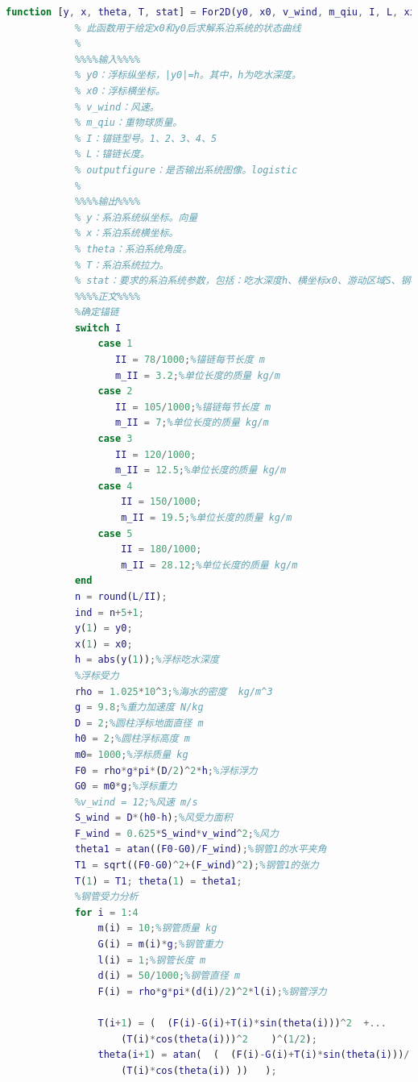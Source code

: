             \begin{lstlisting}[language = Matlab]
            function [y, x, theta, T, stat] = For2D(y0, x0, v_wind, m_qiu, I, L, xitong_figure)
            % 此函数用于给定x0和y0后求解系泊系统的状态曲线
            %
            %%%%输入%%%%
            % y0：浮标纵坐标，|y0|=h。其中，h为吃水深度。
            % x0：浮标横坐标。
            % v_wind：风速。
            % m_qiu：重物球质量。
            % I：锚链型号。1、2、3、4、5
            % L：锚链长度。
            % outputfigure：是否输出系统图像。logistic
            %
            %%%%输出%%%%
            % y：系泊系统纵坐标。向量
            % x：系泊系统横坐标。
            % theta：系泊系统角度。
            % T：系泊系统拉力。
            % stat：要求的系泊系统参数，包括：吃水深度h、横坐标x0、游动区域S、钢桶竖直夹角alpha1、锚链底端水平夹角alpha2、风速v_wind、重物球质量m、系统状态yxthetaT。stats
            %%%%正文%%%%
            %确定锚链
            switch I
                case 1
                   II = 78/1000;%锚链每节长度 m
                   m_II = 3.2;%单位长度的质量 kg/m
                case 2
                   II = 105/1000;%锚链每节长度 m
                   m_II = 7;%单位长度的质量 kg/m
                case 3
                   II = 120/1000;
                   m_II = 12.5;%单位长度的质量 kg/m
                case 4
                    II = 150/1000;
                    m_II = 19.5;%单位长度的质量 kg/m
                case 5
                    II = 180/1000;
                    m_II = 28.12;%单位长度的质量 kg/m
            end
            n = round(L/II);
            ind = n+5+1;
            y(1) = y0;
            x(1) = x0;
            h = abs(y(1));%浮标吃水深度
            %浮标受力
            rho = 1.025*10^3;%海水的密度  kg/m^3
            g = 9.8;%重力加速度 N/kg
            D = 2;%圆柱浮标地面直径 m
            h0 = 2;%圆柱浮标高度 m
            m0= 1000;%浮标质量 kg
            F0 = rho*g*pi*(D/2)^2*h;%浮标浮力
            G0 = m0*g;%浮标重力
            %v_wind = 12;%风速 m/s
            S_wind = D*(h0-h);%风受力面积
            F_wind = 0.625*S_wind*v_wind^2;%风力
            theta1 = atan((F0-G0)/F_wind);%钢管1的水平夹角
            T1 = sqrt((F0-G0)^2+(F_wind)^2);%钢管1的张力
            T(1) = T1; theta(1) = theta1;
            %钢管受力分析
            for i = 1:4
                m(i) = 10;%钢管质量 kg
                G(i) = m(i)*g;%钢管重力
                l(i) = 1;%钢管长度 m
                d(i) = 50/1000;%钢管直径 m
                F(i) = rho*g*pi*(d(i)/2)^2*l(i);%钢管浮力

                T(i+1) = (  (F(i)-G(i)+T(i)*sin(theta(i)))^2  +...
                    (T(i)*cos(theta(i)))^2    )^(1/2);
                theta(i+1) = atan(  (  (F(i)-G(i)+T(i)*sin(theta(i)))/...
                    (T(i)*cos(theta(i)) ))   );


\end{lstlisting}
